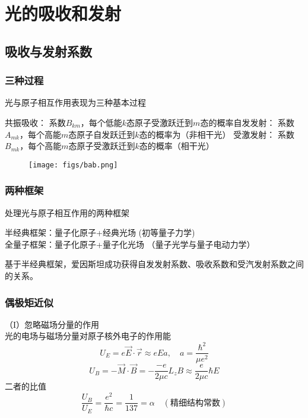 \section{ 光的吸收和发射}

\subsection{吸收与发射系数}

\begin{frame} 
  \frametitle{三种过程}
  \begin{minipage}[b]{0.99\textwidth}
    \vspace{0.3em}
    光与原子相互作用表现为三种基本过程  
    \begin{itemize}
      \Item 共振吸收： 系数$B_{km}$，每个低能$k$态原子受激跃迁到$m$态的概率\emf[$B_{km}I$]
      \Item 自发发射： 系数$A_{mk}$，每个高能$m$态原子自发跃迁到$k$态的概率为\emf[$A_{mk}$]（非相干光）
      \Item 受激发射： 系数$B_{mk}$，每个高能$m$态原子受激跃迁到$k$态的概率\emf[$B_{mk}I$] （相干光）
    \end{itemize}
    \vspace{2em}
  \end{minipage}
  \begin{minipage}[b]{0.99\textwidth}
 \begin{figure}[h]
    \centering
    \texttt{[image: figs/bab.png]}
\end{figure} 
\end{minipage}
\end{frame} 

\begin{frame} 
  \frametitle{两种框架}
  处理光与原子相互作用的两种框架
  \begin{itemize}
    \Item 半经典框架：量子化原子+经典光场 (初等量子力学)\\
    \Item 全量子框架：量子化原子+量子化光场 （量子光学与量子电动力学）
  \end{itemize}
  基于半经典框架，爱因斯坦成功获得自发发射系数、吸收系数和受汽发射系数之间的关系。
\end{frame} 

\begin{frame} 
  \frametitle{偶极矩近似}
  （I）忽略磁场分量的作用 \\
  光的电场与磁场分量对原子核外电子的作用能
  \[ U_E = e \vec{E}\cdot \vec{r} \approx e E a, \quad a = \frac{\hbar^2}{\mu e^2} \]
  \[ U_B = - \vec{M}\cdot \vec{B} =  - \frac{-e}{2\mu c } L_z B\approx \frac{e}{2\mu c } \hbar E \]
  二者的比值
  \[ \frac{U_B}{U_E} = \frac{e^2}{\hbar c } = \frac{1}{137} =\alpha \quad (\text{精细结构常数})\]
\end{frame} 

